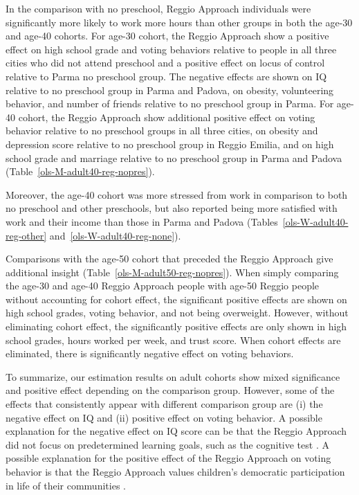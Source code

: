 In the comparison with no preschool, Reggio Approach individuals were significantly more likely to work more hours than other groups in both the age-30 and age-40 cohorts. For age-30 cohort, the Reggio Approach show a positive effect on high school grade and voting behaviors relative to people in all three cities who did not attend preschool and a positive effect on locus of control relative to Parma no preschool group. The negative effects are shown on IQ relative to no preschool group in Parma and Padova, on obesity, volunteering behavior, and number of friends relative to no preschool group in Parma. For age-40 cohort, the Reggio Approach show additional positive effect on voting behavior relative to no preschool groups in all three cities, on obesity and depression score relative to no preschool group in Reggio Emilia, and on high school grade and marriage relative to no preschool group in Parma and Padova (Table~\ref{ols-M-adult40-reg-nopres}).

Moreover, the age-40 cohort was more stressed from work in comparison to both no preschool and other preschools, but also reported being more satisfied with work and their income than those in Parma and Padova (Tables~\ref{ols-W-adult40-reg-other} and~\ref{ols-W-adult40-reg-none}). 

Comparisons with the age-50 cohort that preceded the Reggio Approach give additional insight (Table~\ref{ols-M-adult50-reg-nopres}). When simply comparing the age-30 and age-40 Reggio Approach people with age-50 Reggio people without accounting for cohort effect, the significant positive effects are shown on high school grades, voting behavior, and not being overweight. However, without eliminating cohort effect, the significantly positive effects are only shown in high school grades, hours worked per week, and trust score. When cohort effects are eliminated, there is significantly negative effect on voting behaviors. 

To summarize, our estimation results on adult cohorts show mixed significance and positive effect depending on the comparison group. However, some of the effects that consistently appear with different comparison group are (i) the negative effect on IQ and (ii) positive effect on voting behavior. A possible explanation for the negative effect on IQ score can be that the Reggio Approach did not focus on predetermined learning goals, such as the cognitive test \citep{Cagliari-etal-eds_2016_BOOK_Loris-Malaguzzi}. A possible explanation for the positive effect of the Reggio Approach on voting behavior is that the Reggio Approach values children's democratic participation in life of their communities \citep{Lazzari_2012_Euro-J-Edu}. 

